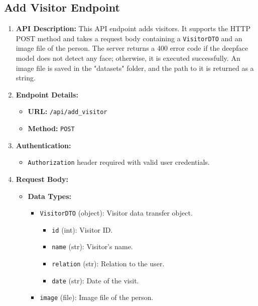 \documentclass[a4 paper, 12pt]{article}
\begin{document}
\subsection{Add Visitor Endpoint}
\begin{enumerate}
  \item \textbf{API Description:} This API endpoint adds visitors. It supports the HTTP POST method and takes a request body containing a \texttt{VisitorDTO} and an image file of the person. The server returns a 400 error code if the deepface model does not detect any face; otherwise, it is executed successfully. An image file is saved in the "datasets" folder, and the path to it is returned as a string.

  \item \textbf{Endpoint Details:}
  \begin{itemize}
    \item \textbf{URL:} \texttt{/api/add\_visitor}
    \item \textbf{Method:} \texttt{POST}
  \end{itemize}
  \item \textbf{Authentication:}
  \begin{itemize}
    \item \texttt{Authorization} header required with valid user credentials.
  \end{itemize}
  \item \textbf{Request Body:}
  \begin{itemize}
    \item \textbf{Data Types:}
    \begin{itemize}
      \item \texttt{VisitorDTO} (object): Visitor data transfer object.
        \begin{itemize}
          \item \texttt{id} (int): Visitor ID.
          \item \texttt{name} (str): Visitor's name.
          \item \texttt{relation} (str): Relation to the user.
          \item \texttt{date} (str): Date of the visit.
        \end{itemize}
      \item \texttt{image} (file): Image file of the person.
    \end{itemize}
  \end{itemize}


\end{enumerate}
\end{document}
